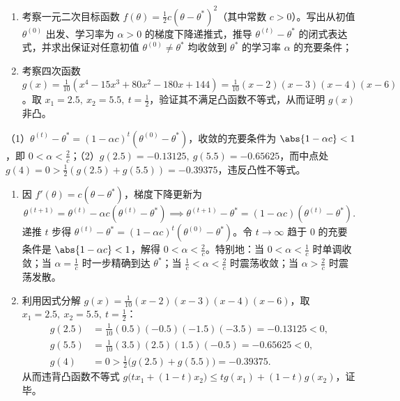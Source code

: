\begin{exercise}[title={凸性判别与梯度下降学习率收敛范围推导},level=standard,points=15,tags={凸函数,学习率,收敛性分析}]
\begin{enumerate}
  \item 考察一元二次目标函数 $f(\theta) = \frac{1}{2}c(\theta - \theta^*)^2$（其中常数 $c > 0$）。写出从初值 $\theta^{(0)}$ 出发、学习率为 $\alpha > 0$ 的梯度下降递推式，推导 $\theta^{(t)} - \theta^*$ 的闭式表达式，并求出保证对任意初值 $\theta^{(0)}\ne\theta^*$ 均收敛到 $\theta^*$ 的学习率 $\alpha$ 的充要条件；
  \item 考察四次函数 $g(x) = \frac{1}{10}(x^4 - 15x^3 + 80x^2 - 180x + 144) = \frac{1}{10}(x-2)(x-3)(x-4)(x-6)$。取 $x_1 = 2.5,\ x_2 = 5.5,\ t = \frac{1}{2}$，验证其不满足凸函数不等式，从而证明 $g(x)$ 非凸。
\end{enumerate}
\begin{answer}
（1）$\theta^{(t)} - \theta^* = (1 - \alpha c)^t(\theta^{(0)} - \theta^*)$，收敛的充要条件为 $\abs{1 - \alpha c} < 1$，即 $0 < \alpha < \frac{2}{c}$；（2）$g(2.5) = -0.13125,\ g(5.5) = -0.65625$，而中点处 $g(4) = 0 > \frac{1}{2}(g(2.5)+g(5.5)) = -0.39375$，违反凸性不等式。
\end{answer}
\begin{solution}
\begin{enumerate}
  \item 因 $f'(\theta) = c(\theta - \theta^*)$，梯度下降更新为
  \[
    \theta^{(t+1)} = \theta^{(t)} - \alpha c(\theta^{(t)} - \theta^*)
    \implies \theta^{(t+1)} - \theta^* = (1 - \alpha c)(\theta^{(t)} - \theta^*).
  \]
  递推 $t$ 步得 $\theta^{(t)} - \theta^* = (1 - \alpha c)^t(\theta^{(0)} - \theta^*)$。令 $t\to\infty$ 趋于 $0$ 的充要条件是 $\abs{1 - \alpha c} < 1$，解得 $0 < \alpha < \frac{2}{c}$。特别地：当 $0 < \alpha < \frac{1}{c}$ 时单调收敛；当 $\alpha = \frac{1}{c}$ 时一步精确到达 $\theta^*$；当 $\frac{1}{c} < \alpha < \frac{2}{c}$ 时震荡收敛；当 $\alpha > \frac{2}{c}$ 时震荡发散。
  \item 利用因式分解 $g(x) = \frac{1}{10}(x-2)(x-3)(x-4)(x-6)$，取 $x_1 = 2.5,\ x_2 = 5.5,\ t = \frac{1}{2}$：
  \[\begin{aligned}
    g(2.5) &= \frac{1}{10}(0.5)(-0.5)(-1.5)(-3.5) = -0.13125 < 0,\\
    g(5.5) &= \frac{1}{10}(3.5)(2.5)(1.5)(-0.5) = -0.65625 < 0,\\
    g(4) &= 0 > \frac{1}{2}\bigl(g(2.5) + g(5.5)\bigr) = -0.39375.
  \end{aligned}\]
  从而违背凸函数不等式 $g\bigl(t x_1 + (1-t)x_2\bigr) \le t g(x_1) + (1-t)g(x_2)$，证毕。
\end{enumerate}
\end{solution}
\end{exercise}

